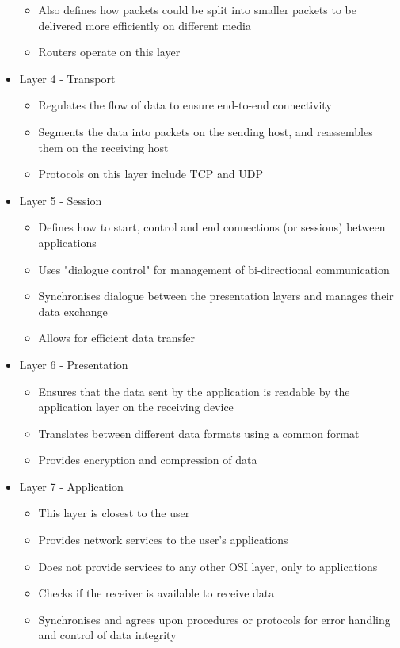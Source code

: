 \begin{itemize}
\begin{itemize}
    \item Also defines how packets could be split into smaller packets to be delivered more efficiently on different media
    \item Routers operate on this layer
  \end{itemize}
  \item Layer 4 - Transport
  \begin{itemize}
    \item Regulates the flow of data to ensure end-to-end connectivity
    \item Segments the data into packets on the sending host, and reassembles them on the receiving host
    \item Protocols on this layer include TCP and UDP
  \end{itemize}
  \item Layer 5 - Session
  \begin{itemize}
    \item Defines how to start, control and end connections (or sessions) between applications
    \item Uses "dialogue control" for management of bi-directional communication
    \item Synchronises dialogue between the presentation layers and manages their data exchange
    \item Allows for efficient data transfer
  \end{itemize}
  \item Layer 6 - Presentation
  \begin{itemize}
    \item Ensures that the data sent by the application is readable by the application layer on the receiving device
    \item Translates between different data formats using a common format
    \item Provides encryption and compression of data
  \end{itemize}
  \item Layer 7 - Application
  \begin{itemize}
    \item This layer is closest to the user
    \item Provides network services to the user's applications
    \item Does not provide services to any other OSI layer, only to applications
    \item Checks if the receiver is available to receive data
    \item Synchronises and agrees upon procedures or protocols for error handling and control of data integrity
  \end{itemize}
\end{itemize}

